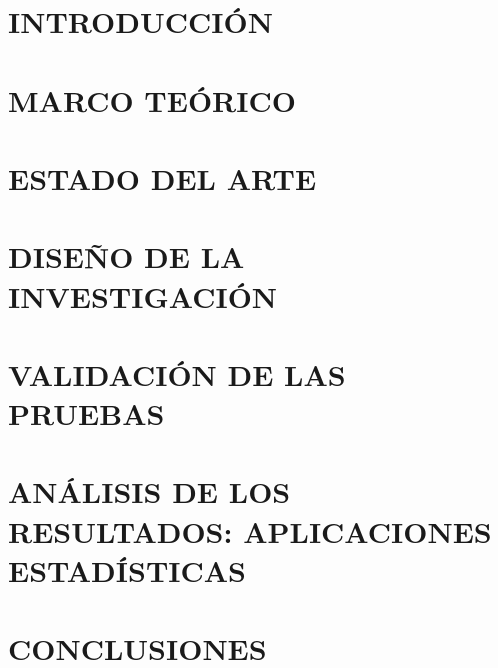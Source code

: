 \documentclass[12pt]{article}
\begin{document}
\clearpage %
\section{INTRODUCCIÓN} 



\clearpage



\newpage
\section{MARCO TEÓRICO} 
    

\newpage
\section{ESTADO DEL ARTE} 
    

\newpage
\section{DISEÑO DE LA INVESTIGACIÓN} 
    

\newpage
\section{VALIDACIÓN DE LAS PRUEBAS} 
    

\newpage
\section{ANÁLISIS DE LOS RESULTADOS: APLICACIONES ESTADÍSTICAS} 
    

\newpage
\section{CONCLUSIONES} 
    
\end{document}

